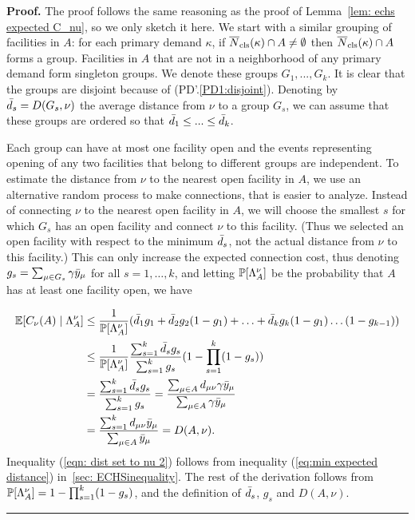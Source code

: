 \documentclass[oneside,final]{ucr}
\newenvironment{proof}[1][Proof]{\textbf{#1.} }{\ \rule{0.5em}{0.5em}}
\def\dsp{\def\baselinestretch{2.0}\large\normalsize}
\def\ssp{\def\baselinestretch{1.0}\large\normalsize}
\begin{document}
\begin{proof}
  The proof follows the same reasoning as the proof of Lemma~\ref{lem:
    echs expected C_nu}, so we only sketch it here. We start with a
  similar grouping of facilities in $A$: for each primary demand
  $\kappa$, if ${\overline{N}}_{{\mbox{\scriptsize\rm cls}}}(\kappa)\cap A\neq\emptyset$ then
  ${\overline{N}}_{{\mbox{\scriptsize\rm cls}}}(\kappa)\cap A$ forms a group. Facilities in $A$ that are
  not in a neighborhood of any primary demand form singleton groups.
  We denote these groups $G_1,...,G_k$. It is clear that the groups
  are disjoint because of (PD'.\ref{PD1:disjoint}). Denoting by
  ${\bar d}_s = D(G_s, \nu)$ the average distance from $\nu$ to a group $G_s$, we
  can assume that these groups are ordered so that ${\bar d}_1\le ... \le
  {\bar d}_k$.

  Each group can have at most one facility open and the events
  representing opening of any two facilities that belong to different
  groups are independent. To estimate the distance from $\nu$ to the
  nearest open facility in $A$, we use an alternative
  random process to make connections, that is easier to
  analyze. Instead of connecting $\nu$ to the nearest open facility in
  $A$, we will choose the smallest $s$ for which $G_s$ has an open
  facility and connect $\nu$ to this facility. (Thus we selected an
  open facility with respect to the minimum ${\bar d}_s$, not the actual
  distance from $\nu$ to this facility.)  This can only increase the
  expected connection cost, thus denoting $g_s = \sum_{\mu\in G_s}
  \gamma{\bar y}_\mu$ for all $s=1,\ldots,k$, and letting $\mathbb{P}[\Lambda^\nu_A]$
  be the probability that $A$ has at least one facility open, we have

\ssp
\begin{align}
    \mathbb{E}[C_\nu(A) \mid \Lambda^\nu_A] &\leq \frac{1}{\mathbb{P}[\Lambda^\nu_A]} ({\bar d}_1 g_1 +
    {\bar d}_2 g_2 (1 - g_1) + \ldots + {\bar d}_k  g_k(1 -
    g_1)\ldots(1-g_{k-1}))
    \label{eqn: dist set to nu 1}
    \\
    &\leq \frac{1}{\mathbb{P}[\Lambda^\nu_A]} \frac{\sum_{s=1}^k {\bar d}_s
      g_s}{\sum_{s=1}^k  g_s} (1 - \prod_{s=1}^k (1 -  g_s))
    \label{eqn: dist set to nu 2}
    \\
    \notag
    &= \frac{\sum_{s=1}^k {\bar d}_s g_s}{\sum_{s=1}^k g_s} =
    \frac{\sum_{\mu \in A} d_{\mu\nu} \gamma {\bar y}_{\mu}}{\sum_{\mu
        \in A} \gamma {\bar y}_{\mu}}
    \\
    \notag
    &= \frac{\sum_{s=1}^k d_{\mu\nu} {\bar y}_{\mu}}{\sum_{\mu \in A}
      {\bar y}_{\mu}} = D(A, \nu).
\end{align}
\dsp
Inequality (\ref{eqn: dist set to nu 2}) follows from inequality
(\ref{eq:min expected distance}) in~\ref{sec: ECHSinequality}. The rest of the
derivation follows from $\mathbb{P}[\Lambda^\nu_A] = 1 - \prod_{s=1}^k (1 -
g_s)$, and the definition of ${\bar d}_s$, $g_s$ and $D(A,\nu)$.
\end{proof}
\end{document}
